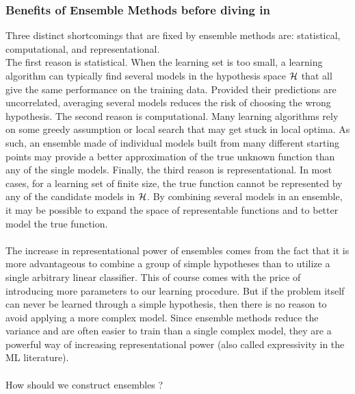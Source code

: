 \subsubsection{Benefits of Ensemble Methods before diving in}
Three distinct shortcomings that are fixed by ensemble methods are: statistical, computational, and representational.\\
The first reason is statistical. When the learning set is too small, a learning algorithm can typically find several models in the hypothesis space $\mathcal{H}$ that all give the same performance on the training data. Provided their predictions are uncorrelated, averaging several models reduces the risk of choosing the wrong hypothesis. The second reason is computational. Many learning algorithms rely on some greedy assumption or local search that may get stuck in local optima. As such, an ensemble made of individual models built from many different starting points may provide a better approximation of the true unknown function than any of the single models. Finally, the third reason is representational. In most cases, for a learning set of finite size, the true function cannot be represented by any of the candidate models in $\mathcal{H}$. By combining several models in an ensemble, it may be possible to expand the space of representable functions and to better model the true function.\\
\\ 
The increase in representational power of ensembles comes from the fact that it is more advantageous to combine a group of simple hypotheses than to utilize a single arbitrary linear classifier. This of course comes with the price of introducing more parameters to our learning procedure. But if the problem itself can never be learned through a simple hypothesis, then there is no reason to avoid applying a more complex model. Since ensemble methods reduce the variance and are often easier to train than a single complex model, they are a powerful way of increasing representational power (also called expressivity in the ML literature).\\
\\
How should we construct ensembles ?\\
